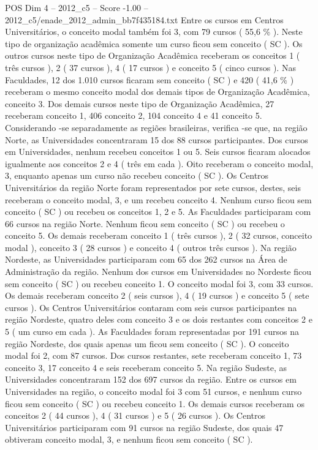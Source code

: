 \begin{textsample}{POS Dim 4 – 2012\_c5 – Score -1.00 – 2012\_c5/enade\_2012\_admin\_bb7f435184.txt}
Entre os cursos em Centros Universitários, o conceito modal também foi 3, com 79 cursos ( 55,6 \% ).
Neste tipo de organização acadêmica somente um curso ficou sem conceito ( SC ).
Os outros cursos neste tipo de Organização Acadêmica receberam os conceitos 1 ( três cursos ), 2 ( 37 cursos ), 4 ( 17 cursos ) e conceito 5 ( cinco cursos ).
Nas Faculdades, 12 dos 1.010 cursos ficaram sem conceito ( SC ) e 420 ( 41,6 \% ) receberam o mesmo conceito modal dos demais tipos de Organização Acadêmica, conceito 3.
Dos demais cursos neste tipo de Organização Acadêmica, 27 receberam conceito 1, 406 conceito 2, 104 conceito 4 e 41 conceito 5.
Considerando -se separadamente as regiões brasileiras, verifica -se que, na região Norte, as Universidades concentraram 15 dos 88 cursos participantes.
Dos cursos em Universidades, nenhum recebeu conceitos 1 ou 5.
Seis cursos ficaram alocados igualmente aos conceitos 2 e 4 ( três em cada ).
Oito receberam o conceito modal, 3, enquanto apenas um curso não recebeu conceito ( SC ).
Os Centros Universitários da região Norte foram representados por sete cursos, destes, seis receberam o conceito modal, 3, e um recebeu conceito 4.
Nenhum curso ficou sem conceito ( SC ) ou recebeu os conceitos 1, 2 e 5.
As Faculdades participaram com 66 cursos na região Norte.
Nenhum ficou sem conceito ( SC ) ou recebeu o conceito 5.
Os demais receberam conceito 1 ( três cursos ), 2 ( 32 cursos, conceito modal ), conceito 3 ( 28 cursos ) e conceito 4 ( outros três cursos ).
Na região Nordeste, as Universidades participaram com 65 dos 262 cursos na Área de Administração da região.
Nenhum dos cursos em Universidades no Nordeste ficou sem conceito ( SC ) ou recebeu conceito 1.
O conceito modal foi 3, com 33 cursos.
Os demais receberam conceito 2 ( seis cursos ), 4 ( 19 cursos ) e conceito 5 ( sete cursos ).
Os Centros Universitários contaram com seis cursos participantes na região Nordeste, quatro deles com conceito 3 e os dois restantes com conceitos 2 e 5 ( um curso em cada ).
As Faculdades foram representadas por 191 cursos na região Nordeste, dos quais apenas um ficou sem conceito ( SC ).
O conceito modal foi 2, com 87 cursos.
Dos cursos restantes, sete receberam conceito 1, 73 conceito 3, 17 conceito 4 e seis receberam conceito 5.
Na região Sudeste, as Universidades concentraram 152 dos 697 cursos da região.
Entre os cursos em Universidades na região, o conceito modal foi 3 com 51 cursos, e nenhum curso ficou sem conceito ( SC ) ou recebeu conceito 1.
Os demais cursos receberam os conceitos 2 ( 44 cursos ), 4 ( 31 cursos ) e 5 ( 26 cursos ).
Os Centros Universitários participaram com 91 cursos na região Sudeste, dos quais 47 obtiveram conceito modal, 3, e nenhum ficou sem conceito ( SC ).

\end{textsample}
